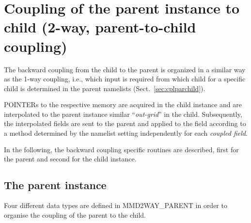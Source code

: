 \documentclass[11pt,twoside]{article}
\begin{document}
\section{Coupling of the parent instance to child (2-way,
parent-to-child coupling) \label{sec:p2c}}
The backward coupling from the child to the parent is organized in a
similar way  
as the 1-way coupling, i.e., which input is required from which child
for a specific child is determined in the parent namelists
(Sect.\ \ref{sec:cplparchild}).   

{\footnotesize POINTER}s to the respective memory are acquired in the
child instance and are 
interpolated to the parent instance similar ``{\it out-grid}'' in the
child. 
Subsequently, the interpolated fields are sent to the parent and applied
to the field according to a method determined by the namelist setting
independently for each {\it coupled field}.

In the following, the backward coupling specific routines are described, first
for the parent and second for the child instance.

\subsection{The parent instance}

Four different data types are defined in MMD2WAY\_PARENT in order to organise
the coupling of the parent to the child.
\end{document}
